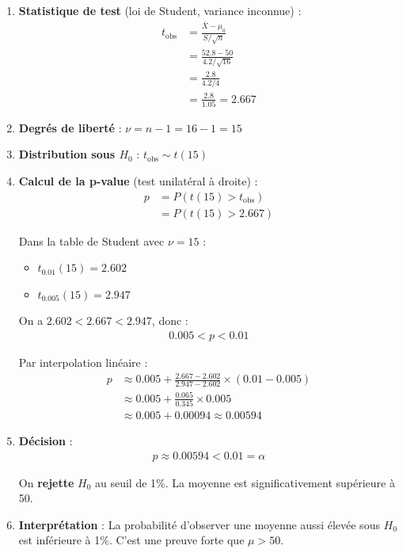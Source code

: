 \documentclass[11pt,a4paper]{article}
\begin{document}
\begin{enumerate}
    \item \textbf{Statistique de test} (loi de Student, variance inconnue) :
    \begin{align*}
    t_{\text{obs}} &= \frac{\bar{X} - \mu_0}{S/\sqrt{n}} \\
    &= \frac{52.8 - 50}{4.2/\sqrt{16}} \\
    &= \frac{2.8}{4.2/4} \\
    &= \frac{2.8}{1.05} = 2.667
    \end{align*}
    
    \item \textbf{Degrés de liberté} : $\nu = n - 1 = 16 - 1 = 15$
    
    \item \textbf{Distribution sous $H_0$} : $t_{\text{obs}} \sim t(15)$
    
    \item \textbf{Calcul de la p-value} (test unilatéral à droite) :
    \begin{align*}
    p &= P(t(15) > t_{\text{obs}}) \\
    &= P(t(15) > 2.667)
    \end{align*}
    
    Dans la table de Student avec $\nu = 15$ :
    \begin{itemize}
        \item $t_{0.01}(15) = 2.602$
        \item $t_{0.005}(15) = 2.947$
    \end{itemize}
    
    On a $2.602 < 2.667 < 2.947$, donc :
    \begin{align*}
    0.005 < p < 0.01
    \end{align*}
    
    Par interpolation linéaire :
    \begin{align*}
    p &\approx 0.005 + \frac{2.667 - 2.602}{2.947 - 2.602} \times (0.01 - 0.005) \\
    &\approx 0.005 + \frac{0.065}{0.345} \times 0.005 \\
    &\approx 0.005 + 0.00094 \approx 0.00594
    \end{align*}
    
    \item \textbf{Décision} :
    \begin{align*}
    p \approx 0.00594 < 0.01 = \alpha
    \end{align*}
    
    On \textbf{rejette} $H_0$ au seuil de 1\%. La moyenne est significativement supérieure à 50.
    
    \item \textbf{Interprétation} : La probabilité d'observer une moyenne aussi élevée sous $H_0$ est inférieure à 1\%. C'est une preuve forte que $\mu > 50$.
\end{enumerate}
\end{document}

